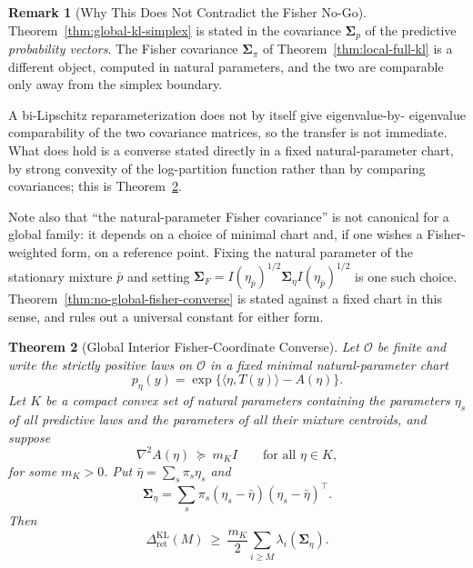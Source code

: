 \documentclass[12pt]{article}
\newtheorem{theorem}{Theorem}[section]
\theoremstyle{definition}
\newtheorem{remark}[theorem]{Remark}
\newcommand{\RetKL}{\Delta_{\mathrm{ret}}^{\mathrm{KL}}}
\begin{document}
\begin{remark}[Why This Does Not Contradict the Fisher No-Go]
\label{rem:simplex-vs-fisher}
Theorem~\ref{thm:global-kl-simplex} is stated in the covariance $\bm{\Sigma}_p$ of
the predictive \emph{probability vectors}.  The Fisher covariance
$\bm{\Sigma}_\pi$ of Theorem~\ref{thm:local-full-kl} is a different object, computed
in natural parameters, and the two are comparable only away from the simplex
boundary.

A bi-Lipschitz reparameterization does not by itself give eigenvalue-by-
eigenvalue comparability of the two covariance matrices, so the transfer is not
immediate.  What does hold is a converse stated directly in a fixed
natural-parameter chart, by strong convexity of the log-partition function
rather than by comparing covariances; this is
Theorem~\ref{thm:global-interior-fisher}.

Note also that ``the natural-parameter Fisher covariance'' is not canonical for
a global family: it depends on a choice of minimal chart and, if one wishes a
Fisher-weighted form, on a reference point.  Fixing the natural parameter of
the stationary mixture $\bar p$ and setting
$\bm{\Sigma}_F=I(\eta_{\bar p})^{1/2}\bm{\Sigma}_\eta I(\eta_{\bar p})^{1/2}$ is one such
choice.  Theorem~\ref{thm:no-global-fisher-converse} is stated against a fixed
chart in this sense, and rules out a universal constant for either form.
\end{remark}

\begin{theorem}[Global Interior Fisher-Coordinate Converse]
\label{thm:global-interior-fisher}
Let $\mathcal O$ be finite and write the strictly positive laws on
$\mathcal O$ in a fixed minimal natural-parameter chart
\[
p_\eta(y)=\exp\bigl\{\langle\eta,T(y)\rangle-A(\eta)\bigr\}.
\]
Let $K$ be a compact convex set of natural parameters containing the
parameters $\eta_s$ of all predictive laws \emph{and the parameters of all
their mixture centroids}, and suppose
\[
\nabla^2A(\eta)\ \succeq\ m_K I
\qquad\text{for all }\eta\in K,
\]
for some $m_K>0$.  Put $\bar\eta=\sum_s\pi_s\eta_s$ and
\[
\bm{\Sigma}_\eta=\sum_s\pi_s(\eta_s-\bar\eta)(\eta_s-\bar\eta)^{\!\top}.
\]
Then
\[
\RetKL(M)\ \ge\ \frac{m_K}{2}\sum_{i\ge M}\lambda_i(\bm{\Sigma}_\eta).
\]
\end{theorem}
\end{document}
